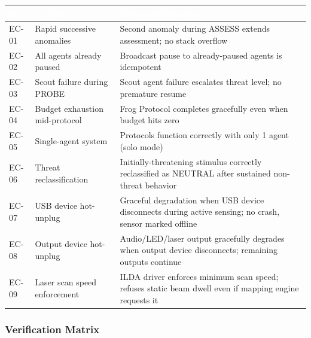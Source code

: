\documentclass[11pt,letterpaper]{article}
\newcommand{\tableheader}[1]{\textbf{\sffamily\textcolor{white}{#1}}}
\begin{document}
\begin{center}
\begin{tabularx}{\textwidth}{C{1.2cm}L{3.5cm}X}
\toprule
{}
\tableheader{ID} & \tableheader{Verifies} & \tableheader{Expected Behavior} \\
\midrule
EC-01 & Rapid successive anomalies & Second anomaly during ASSESS extends assessment; no stack overflow \\
EC-02 & All agents already paused & Broadcast pause to already-paused agents is idempotent \\
EC-03 & Scout failure during PROBE & Scout agent failure escalates threat level; no premature resume \\
EC-04 & Budget exhaustion mid-protocol & Frog Protocol completes gracefully even when budget hits zero \\
EC-05 & Single-agent system & Protocols function correctly with only 1 agent (solo mode) \\
EC-06 & Threat reclassification & Initially-threatening stimulus correctly reclassified as NEUTRAL after sustained non-threat behavior \\
EC-07 & USB device hot-unplug & Graceful degradation when USB device disconnects during active sensing; no crash, sensor marked offline \\
EC-08 & Output device hot-unplug & Audio/LED/laser output gracefully degrades when output device disconnects; remaining outputs continue \\
EC-09 & Laser scan speed enforcement & ILDA driver enforces minimum scan speed; refuses static beam dwell even if mapping engine requests it \\
\bottomrule
\end{tabularx}
\end{center}

\subsubsection{Verification Matrix}
\end{document}

